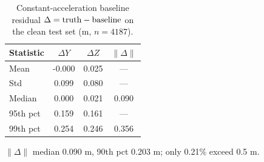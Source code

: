 \begin{table}[htbp]
\centering
\caption{Constant-acceleration baseline residual $\Delta={\rm truth}-{\rm baseline}$ on the clean test set (m, $n=4187$).}
\label{tab:p0-residual}
\begin{tabular}{lccc}
\toprule
Statistic & $\Delta Y$ & $\Delta Z$ & $\|\Delta\|$ \\
\midrule
Mean & -0.000 & 0.025 & --- \\
Std & 0.099 & 0.080 & --- \\
Median & 0.000 & 0.021 & 0.090 \\
95th pct & 0.159 & 0.161 & --- \\
99th pct & 0.254 & 0.246 & 0.356 \\
\bottomrule
\end{tabular}
\par\smallskip\footnotesize $\|\Delta\|$ median 0.090 m, 90th pct 0.203 m; only 0.21\% exceed 0.5 m.
\end{table}
